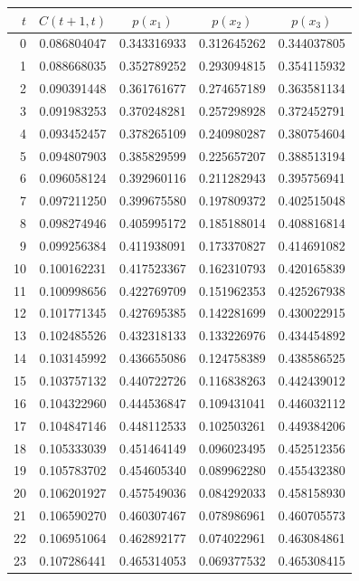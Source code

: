 \begin{tabular}{rcccc}
\toprule
$t$ & $C(t+1,t)$ & $p(x_1)$ & $p(x_2)$ & $p(x_3)$ \\
\midrule
0 & 0.086804047 & 0.343316933 & 0.312645262 & 0.344037805 \\
1 & 0.088668035 & 0.352789252 & 0.293094815 & 0.354115932 \\
2 & 0.090391448 & 0.361761677 & 0.274657189 & 0.363581134 \\
3 & 0.091983253 & 0.370248281 & 0.257298928 & 0.372452791 \\
4 & 0.093452457 & 0.378265109 & 0.240980287 & 0.380754604 \\
5 & 0.094807903 & 0.385829599 & 0.225657207 & 0.388513194 \\
6 & 0.096058124 & 0.392960116 & 0.211282943 & 0.395756941 \\
7 & 0.097211250 & 0.399675580 & 0.197809372 & 0.402515048 \\
8 & 0.098274946 & 0.405995172 & 0.185188014 & 0.408816814 \\
9 & 0.099256384 & 0.411938091 & 0.173370827 & 0.414691082 \\
10 & 0.100162231 & 0.417523367 & 0.162310793 & 0.420165839 \\
11 & 0.100998656 & 0.422769709 & 0.151962353 & 0.425267938 \\
12 & 0.101771345 & 0.427695385 & 0.142281699 & 0.430022915 \\
13 & 0.102485526 & 0.432318133 & 0.133226976 & 0.434454892 \\
14 & 0.103145992 & 0.436655086 & 0.124758389 & 0.438586525 \\
15 & 0.103757132 & 0.440722726 & 0.116838263 & 0.442439012 \\
16 & 0.104322960 & 0.444536847 & 0.109431041 & 0.446032112 \\
17 & 0.104847146 & 0.448112533 & 0.102503261 & 0.449384206 \\
18 & 0.105333039 & 0.451464149 & 0.096023495 & 0.452512356 \\
19 & 0.105783702 & 0.454605340 & 0.089962280 & 0.455432380 \\
20 & 0.106201927 & 0.457549036 & 0.084292033 & 0.458158930 \\
21 & 0.106590270 & 0.460307467 & 0.078986961 & 0.460705573 \\
22 & 0.106951064 & 0.462892177 & 0.074022961 & 0.463084861 \\
23 & 0.107286441 & 0.465314053 & 0.069377532 & 0.465308415 \\

\end{tabular}
